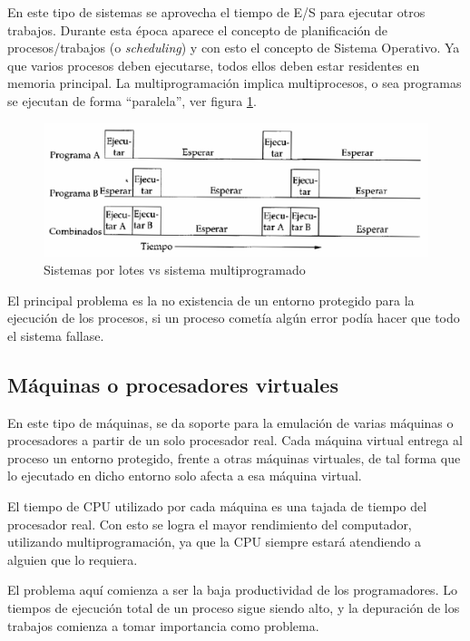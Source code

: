 En este tipo de sistemas se aprovecha el tiempo de E/S para ejecutar otros
trabajos. Durante esta época aparece el concepto de planificación de
procesos/trabajos (o \textit{scheduling}) y con esto el concepto de Sistema
Operativo. Ya que varios procesos deben ejecutarse, todos ellos deben estar
residentes en memoria principal. La multiprogramación implica multiprocesos, o
sea programas se ejecutan de forma ``paralela'', ver figura
\ref{fig:multiprogramado}.

\begin{figure}[htbp]
\centering
\includegraphics[scale=1.]{img/C02_historia/multiprogramacion.png}
\caption{Sistemas por lotes vs sistema multiprogramado}
\label{fig:multiprogramado}
\end{figure}

El principal problema es la no existencia de un entorno protegido para la
ejecución de los procesos, si un proceso cometía algún error podía hacer que
todo el sistema fallase.

\subsection{Máquinas o procesadores virtuales}
En este tipo de máquinas, se da soporte para la emulación de varias máquinas o
procesadores a partir de un solo procesador real. Cada máquina virtual entrega
al proceso un entorno protegido, frente a otras máquinas virtuales, de tal forma
que lo ejecutado en dicho entorno solo afecta a esa máquina virtual.

El tiempo de CPU utilizado por cada máquina es una tajada de tiempo del
procesador real. Con esto se logra el mayor rendimiento del computador,
utilizando multiprogramación, ya que la CPU siempre estará atendiendo a alguien
que lo requiera.

El problema aquí comienza a ser la baja productividad de los programadores. Lo
tiempos de ejecución total de un proceso sigue siendo alto, y la depuración de
los trabajos comienza a tomar importancia como problema.

